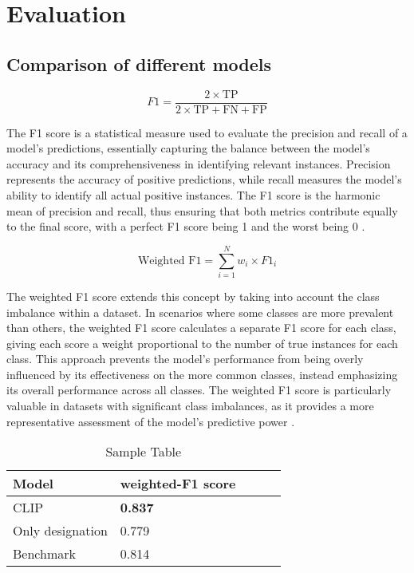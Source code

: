 \chapter{Evaluation}
\label{sec:evaluation}
\section{Comparison of different models}

\begin{equation}
	F1 = \frac{2 \times \text{TP}}{2 \times \text{TP} + \text{FN} + \text{FP}}
\end{equation}

The F1 score is a statistical measure used to evaluate the precision and recall of a model's predictions, essentially capturing the balance between the model's accuracy and its comprehensiveness in identifying relevant instances. Precision represents the accuracy of positive predictions, while recall measures the model's ability to identify all actual positive instances. The F1 score is the harmonic mean of precision and recall, thus ensuring that both metrics contribute equally to the final score, with a perfect F1 score being 1 and the worst being 0 \cite{chicco-2020}.

\begin{equation}
	\text{Weighted F1} = \sum_{i=1}^{N} w_i \times F1_i
\end{equation}

The weighted F1 score extends this concept by taking into account the class imbalance within a dataset. In scenarios where some classes are more prevalent than others, the weighted F1 score calculates a separate F1 score for each class, giving each score a weight proportional to the number of true instances for each class. This approach prevents the model's performance from being overly influenced by its effectiveness on the more common classes, instead emphasizing its overall performance across all classes. The weighted F1 score is particularly valuable in datasets with significant class imbalances, as it provides a more representative assessment of the model's predictive power \cite{leung-2022}.

\begin{table}[h]
	\centering
	\begin{tabular}{|l|l|l|l|l|}
		\hline
		Model            & weighted-F1 score \\ \hline
		CLIP             & \textbf{0.837}    \\
		Only designation & 0.779             \\
		Benchmark        & 0.814             \\
		\hline
	\end{tabular}
	\caption{Sample Table}
	\label{tab:my_label}
\end{table}

